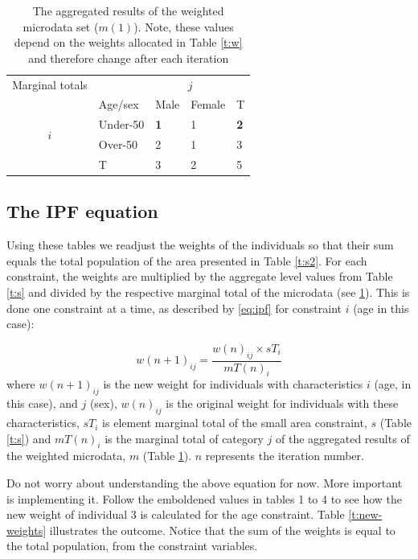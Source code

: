 \documentclass[a4paper, 11pt, twoside]{article}
\begin{document}
\begin{table}[htbp]
\centering
\caption[The aggregated results of the weighted
microdata set]{The aggregated results of the weighted
microdata set ($m(1)$).
Note, these values depend on the
weights allocated in Table \ref{t:w} and therefore
 change after each iteration}

\begin{tabular}{cllll}\toprule
Marginal totals&  & \multicolumn{2}{c}{$j$} & \\
& Age/sex & Male & Female & T\\ \midrule
\multirow{2}{*}{$i$} & Under-50 & \textbf{1} & 1 & \textbf{2}\\
& Over-50 & 2 & 1 &3 \\
& T & 3 & 2 &5\\
\bottomrule
\end{tabular}
\label{t:m}
\end{table}

\subsection{The IPF equation} \label{ipfeq}
Using these tables we readjust the weights of the
individuals so that their sum equals the total population of the area presented
in Table \ref{t:s2}.
For each constraint, the weights are multiplied
by the aggregate level values from Table \ref{t:s} and divided by the
respective marginal total of the microdata (see \cref{t:m}).
This is done one constraint at a time, as described by
\cref{eq:ipf} for constraint $i$ (age in this case):

\begin{equation}
w(n+1)_{ij} = \frac{w(n)_{ij} \times sT_{i}}{mT(n)_{i}}
\label{eq:ipf}
\end{equation}
where $w(n+1)_{ij}$ is the new weight for individuals with characteristics $i$
(age, in this case), and $j$ (sex),  $w(n)_{ij}$ is the original
weight for individuals with these characteristics, $sT_{i}$ is element
marginal total of the small area constraint, $s$
(Table \ref{t:s}) and $mT(n)_{i}$ is the marginal total of category
$j$ of the aggregated results of the weighted
microdata, $m$ (Table \ref{t:m}).
$n$ represents the iteration number.

Do not worry about understanding the above equation for now.
More important is implementing it. Follow the emboldened values in tables 1 to 4
to see how the new weight of individual 3 is calculated for the age constraint.
Table \ref{t:new-weights} illustrates the outcome. Notice that the
sum of the weights is equal to the total population, from the constraint variables.
\end{document}
